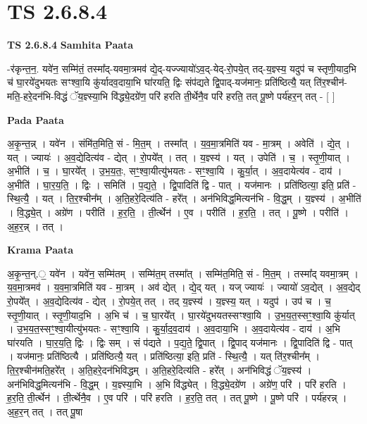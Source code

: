 \documentclass[17pt]{extarticle}
\begin{document}
\section{ TS 2.6.8.4 }

\textbf{TS 2.6.8.4 } \newline
\textbf{Samhita Paata} \newline

-र॑कृन्त॒न॒. यवे॑न॒ सम्मि॑तं॒ तस्मा᳚द्-यवमा॒त्रमव॑ द्ये॒द्-यज्ज्यायो॑ऽव॒द्-येद्-रो॒पये॒त् तद्-य॒ज्ञ्स्य॒ यदुप॑ च स्तृणी॒याद॒भि च॑ घा॒रये॑दुभयतः सꣳश्वा॒यि कु॑र्यादव॒दाया॒भि घा॑रयति॒ द्विः संप॑द्यते द्वि॒पाद्-यज॑मानः॒ प्रति॑ष्ठित्यै॒ यत् ति॑र॒श्चीन॑-मति॒-हरे॒दन॑भि-विद्धं ॅय॒ज्ञ्स्या॒भि वि॑द्ध्ये॒दग्रे॑ण॒ परि॑ हरति ती॒र्थेनै॒व परि॑ हरति॒ तत् पू॒ष्णे पर्य॑हर॒न् तत् - [  ] \newline

\textbf{Pada Paata} \newline

अ॒कृ॒न्त॒न्न् । यवे॑न । संमि॑त॒मिति॒ सं - मि॒त॒म् । तस्मा᳚त् । य॒व॒मा॒त्रमिति॑ यव - मा॒त्रम् । अवेति॑ । द्ये॒त् । यत् । ज्यायः॑ । अ॒व॒द्येदित्य॑व - द्येत् । रो॒पये᳚त् । तत् । य॒ज्ञ्स्य॑ । यत् । उपेति॑ । च॒ । स्तृ॒णी॒यात् । अ॒भीति॑ । च॒ । घा॒रये᳚त् । उ॒भ॒य॒तः॒, सꣳ॒॒श्वा॒यीत्यु॑भयतः - सꣳ॒॒श्वा॒यि । कु॒र्या॒त् । अ॒व॒दायेत्य॑व - दाय॑ । अ॒भीति॑ । घा॒र॒य॒ति॒ । द्विः । समिति॑ । प॒द्य॒ते॒ । द्वि॒पादिति॑ द्वि - पात् । यज॑मानः । प्रति॑ष्ठित्या॒ इति॒ प्रति॑ - स्थि॒त्यै॒ । यत् । ति॒र॒श्चीन᳚म् । अ॒ति॒हरे॒दित्य॑ति - हरे᳚त् । अन॑भिविद्ध॒मित्यन॑भि - वि॒द्ध॒म् । य॒ज्ञ्स्य॑ । अ॒भीति॑ । वि॒द्ध्ये॒त् । अग्रे॑ण । परीति॑ । ह॒र॒ति॒ । ती॒र्त्थेन॑ । ए॒व । परीति॑ । ह॒र॒ति॒ । तत् । पू॒ष्णे । परीति॑ । अ॒ह॒र॒न्न् । तत् ।  \newline


\textbf{Krama Paata} \newline

अ॒कृ॒न्त॒न्.॒ यवे॑न । यवे॑न॒ सम्मि॑तम् । सम्मि॑त॒म् तस्मा᳚त् । सम्मि॑त॒मिति॒ सं - मि॒त॒म् । तस्मा᳚द् यवमा॒त्रम् । य॒व॒मा॒त्रमव॑ । य॒व॒मा॒त्रमिति॑ यव - मा॒त्रम् । अव॑ द्येत् । द्ये॒द् यत् । यज् ज्यायः॑ । ज्यायो॑ ऽव॒द्येत् । अ॒व॒द्येद् रो॒पये᳚त् । अ॒व॒द्येदित्य॑व - द्येत् । रो॒पये॒त् तत् । तद् य॒ज्ञ्स्य॑ । य॒ज्ञ्स्य॒ यत् । यदुप॑ । उप॑ च । च॒ स्तृ॒णी॒यात् । स्तृ॒णी॒याद॒भि । अ॒भि च॑ । च॒ घा॒रये᳚त् । घा॒रये॑दुभयतस्सꣳश्वा॒यि । उ॒भ॒य॒त॒स्सꣳ॒॒श्वा॒यि कु॑र्यात् । उ॒भ॒य॒त॒स्सꣳ॒॒श्वा॒यीत्यु॑भयतः - सꣳ॒॒श्वा॒यि । कु॒र्या॒द॒व॒दाय॑ । अ॒व॒दाया॒भि । अ॒व॒दायेत्य॑व - दाय॑ । अ॒भि घा॑रयति । घा॒र॒य॒ति॒ द्विः । द्विः सम् । सं प॑द्यते । प॒द्य॒ते॒ द्वि॒पात् । द्वि॒पाद् यज॑मानः । द्वि॒पादिति॑ द्वि - पात् । यज॑मानः॒ प्रति॑ष्ठित्यै । प्रति॑ष्ठित्यै॒ यत् । प्रति॑ष्ठित्या॒ इति॒ प्रति॑ - स्थि॒त्यै॒ । यत् ति॑र॒श्चीन᳚म् । ति॒र॒श्चीन॑मति॒हरे᳚त् । अ॒ति॒हरे॒दन॑भिविद्धम् । अ॒ति॒हरे॒दित्य॑ति - हरे᳚त् । अन॑भिविद्धं ॅय॒ज्ञ्स्य॑ । अन॑भिविद्ध॒मित्यन॑भि - वि॒द्ध॒म् । य॒ज्ञ्स्या॒भि । अ॒भि वि॑द्ध्येत् । वि॒द्ध्ये॒दग्रे॑ण । अग्रे॑ण॒ परि॑ । परि॑ हरति । ह॒र॒ति॒ ती॒र्त्थेन॑ । ती॒र्त्थेनै॒व । ए॒व परि॑ । परि॑ हरति । ह॒र॒ति॒ तत् । तत् पू॒ष्णे । पू॒ष्णे परि॑ । पर्य॑हरन्न् । अ॒ह॒र॒न् तत् । तत् पू॒षा \newline
\end{document}
